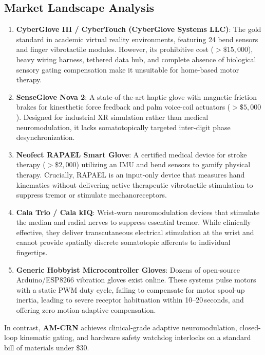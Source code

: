 \documentclass[10pt,twocolumn]{article}
\begin{document}
\subsection{Market Landscape Analysis}
\begin{enumerate}
    \item \textbf{CyberGlove III / CyberTouch (CyberGlove Systems LLC)}: The gold standard in academic virtual reality environments, featuring 24 bend sensors and finger vibrotactile modules. However, its prohibitive cost ($>\$15,000$), heavy wiring harness, tethered data hub, and complete absence of biological sensory gating compensation make it unsuitable for home-based motor therapy.
    \item \textbf{SenseGlove Nova 2}: A state-of-the-art haptic glove with magnetic friction brakes for kinesthetic force feedback and palm voice-coil actuators ($>\$5,000$). Designed for industrial XR simulation rather than medical neuromodulation, it lacks somatotopically targeted inter-digit phase desynchronization.
    \item \textbf{Neofect RAPAEL Smart Glove}: A certified medical device for stroke therapy ($>\$2,000$) utilizing an IMU and bend sensors to gamify physical therapy. Crucially, RAPAEL is an input-only device that measures hand kinematics without delivering active therapeutic vibrotactile stimulation to suppress tremor or stimulate mechanoreceptors.
    \item \textbf{Cala Trio / Cala kIQ}: Wrist-worn neuromodulation devices that stimulate the median and radial nerves to suppress essential tremor. While clinically effective, they deliver transcutaneous electrical stimulation at the wrist and cannot provide spatially discrete somatotopic afferents to individual fingertips.
    \item \textbf{Generic Hobbyist Microcontroller Gloves}: Dozens of open-source Arduino/ESP8266 vibration gloves exist online. These systems pulse motors with a static PWM duty cycle, failing to compensate for motor spool-up inertia, leading to severe receptor habituation within 10--20\,seconds, and offering zero motion-adaptive compensation.
\end{enumerate}
In contrast, \textbf{AM-CRN} achieves clinical-grade adaptive neuromodulation, closed-loop kinematic gating, and hardware safety watchdog interlocks on a standard bill of materials under $\$30$.

\end{document}
